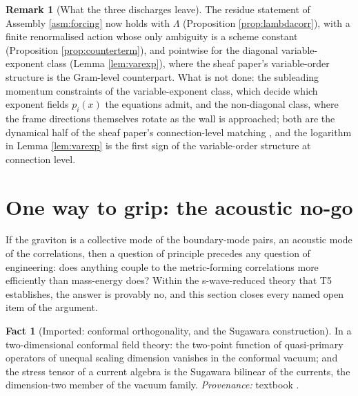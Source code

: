 \documentclass[11pt]{article}
\theoremstyle{definition}
\newtheorem{remark}[theorem]{Remark}
\newtheorem{fact}[theorem]{Fact}
\begin{document}
\begin{remark}[What the three discharges leave]\label{rem:remains}
The residue statement of Assembly \ref{asm:forcing} now holds with $\Lambda$ (Proposition \ref{prop:lambdacorr}), with a finite renormalised action whose only ambiguity is a scheme constant (Proposition \ref{prop:counterterm}), and pointwise for the diagonal variable-exponent class (Lemma \ref{lem:varexp}), where the sheaf paper's variable-order structure \cite[\S 9]{ButlerT4} is the Gram-level counterpart. What is not done: the subleading momentum constraints of the variable-exponent class, which decide which exponent fields $p_i(x)$ the equations admit, and the non-diagonal class, where the frame directions themselves rotate as the wall is approached; both are the dynamical half of the sheaf paper's connection-level matching \cite[Rem.~8.28]{ButlerT4}, and the logarithm in Lemma \ref{lem:varexp} is the first sign of the variable-order structure at connection level.
\end{remark}

\section{One way to grip: the acoustic no-go}\label{sec:grip}

If the graviton is a collective mode of the boundary-mode pairs, an acoustic mode of the correlations, then a question of principle precedes any question of engineering: does anything couple to the metric-forming correlations more efficiently than mass-energy does? Within the s-wave-reduced theory that T5 establishes, the answer is provably no, and this section closes every named open item of the argument.

\begin{fact}[Imported: conformal orthogonality, and the Sugawara construction]\label{fact:cft}
In a two-dimensional conformal field theory: the two-point function of quasi-primary operators of unequal scaling dimension vanishes in the conformal vacuum; and the stress tensor of a current algebra is the Sugawara bilinear of the currents, the dimension-two member of the vacuum family. \emph{Provenance:} textbook \cite[Ch.~4-5 for the two-point functions, Ch.~15 for the Sugawara construction]{DiFrancesco1997}.
\end{fact}
\end{document}
